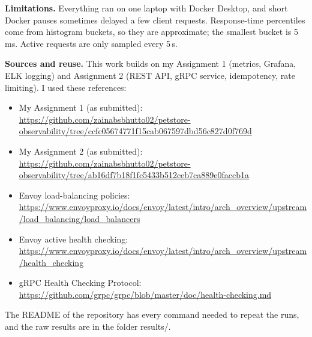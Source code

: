 \documentclass[10pt,a4paper]{article}
\newcommand{\codeus}{\textunderscore\allowbreak}
\newcommand{\code}[1]{{\small\ttfamily\let\_\codeus #1}}
\begin{document}
\textbf{Limitations.} Everything ran on one laptop with Docker Desktop, and short Docker pauses sometimes delayed a
few client requests. Response-time percentiles come from histogram buckets, so they are approximate; the smallest
bucket is 5\,ms. Active requests are only sampled every 5\,s.

\textbf{Sources and reuse.} This work builds on my Assignment 1 (metrics, Grafana, ELK logging) and Assignment 2
(REST API, gRPC service, idempotency, rate limiting). I used these references:
\begin{itemize}
\item My Assignment 1 (as submitted): \url{https://github.com/zainabsbhutto02/petstore-observability/tree/ccfc05674771f15cab067597dbd56c827d0f769d}
\item My Assignment 2 (as submitted): \url{https://github.com/zainabsbhutto02/petstore-observability/tree/ab16df7b18f1fc5433b512ceb7ca889e0faccb1a}
\item Envoy load-balancing policies: \url{https://www.envoyproxy.io/docs/envoy/latest/intro/arch_overview/upstream/load_balancing/load_balancers}
\item Envoy active health checking: \url{https://www.envoyproxy.io/docs/envoy/latest/intro/arch_overview/upstream/health_checking}
\item gRPC Health Checking Protocol: \url{https://github.com/grpc/grpc/blob/master/doc/health-checking.md}
\end{itemize}
The README of the repository has every command needed to repeat the runs, and the raw results are in the folder
\code{results/}.
\end{document}
